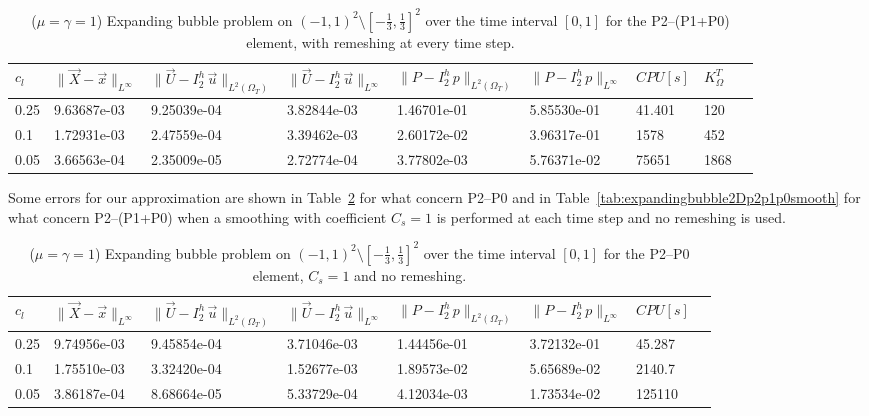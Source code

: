 \documentclass[a4paper,12pt,onecolumn]{article}
\newcommand{\errorXx}{\|\vec{X} - \vec{x}\|_{L^\infty}}
\newcommand{\LerrorUu}[1]{\|\vec U - I^h_{#1}\,\vec u\|_{L^2(\Omega_T)}}
\newcommand{\errorUu}[1]{\|\vec U - I^h_{#1}\,\vec u\|_{L^\infty}}
\newcommand{\errorPp}[1]{\|P - I^h_{#1}\,p\|_{L^\infty}}
\newcommand{\LerrorPp}[1]{\|P - I^h_{#1}\,p\|_{L^2(\Omega_T)}}
\begin{document}
\begin{table}
 \center
 \hspace*{-2cm}
\begin{tabular}{lllllllll}
\hline
$c_l$ & $\errorXx$ & $\LerrorUu2$ & $\errorUu2$ & $\LerrorPp2$ & $\errorPp2$ & $CPU[s]$ & $K_\Omega^T$\\
\hline
0.25 & 9.63687e-03 & 9.25039e-04 & 3.82844e-03 & 1.46701e-01 & 5.85530e-01 & 41.401 & 120\\
0.1 & 1.72931e-03 & 2.47559e-04 & 3.39462e-03 & 2.60172e-02 & 3.96317e-01 & 1578 & 452\\
0.05 & 3.66563e-04 & 2.35009e-05 & 2.72774e-04 & 3.77802e-03 & 5.76371e-02 & 75651 & 1868\\
\hline
\end{tabular}
\hspace*{-2cm}
\caption{($\mu=\gamma=1$) Expanding bubble problem on $(-1,1)^2\setminus[-\frac{1}{3},\frac{1}{3}]^2$ over the time interval $[0,1]$ for the P2--(P1+P0) element, with remeshing at every time step.}
\label{tab:expandingbubble2Dp2p1p0remesh}
\end{table}

Some errors for our approximation are shown in Table~\ref{tab:expandingbubble2Dp2p0smooth} for what concern P2--P0 and in Table~\ref{tab:expandingbubble2Dp2p1p0smooth} for what concern P2--(P1+P0) when a smoothing with coefficient $C_s=1$ is performed at each time step and no remeshing is used.

\begin{table}
 \center
 \hspace*{-2cm}
\begin{tabular}{llllllll}
\hline
$c_l$ & $\errorXx$ & $\LerrorUu2$ & $\errorUu2$ & $\LerrorPp2$ & $\errorPp2$ & $CPU[s]$\\
\hline
0.25 & 9.74956e-03 & 9.45854e-04 & 3.71046e-03 & 1.44456e-01 & 3.72132e-01 & 45.287\\
0.1 & 1.75510e-03 & 3.32420e-04 & 1.52677e-03 & 1.89573e-02 & 5.65689e-02 & 2140.7\\
0.05 & 3.86187e-04 & 8.68664e-05 & 5.33729e-04 & 4.12034e-03 & 1.73534e-02 & 125110\\
\hline
\end{tabular}
\hspace*{-2cm}
\caption{($\mu=\gamma=1$) Expanding bubble problem on $(-1,1)^2\setminus[-\frac{1}{3},\frac{1}{3}]^2$ over the time interval $[0,1]$ for the P2--P0 element, $C_s=1$ and no remeshing.}
\label{tab:expandingbubble2Dp2p0smooth}
\end{table}
\end{document}
